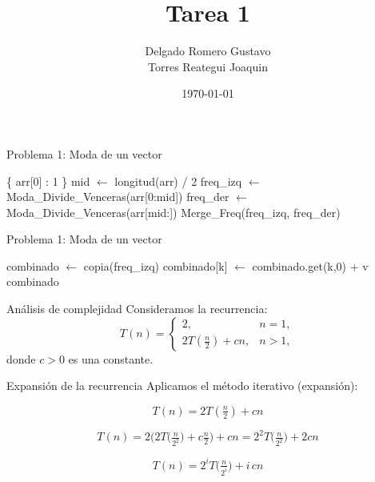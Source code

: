 \documentclass{beamer}
\title{Tarea 1}
\author{Delgado Romero Gustavo \\ Torres Reategui Joaquin}
\date{\today}
\begin{document}
\begin{frame}
  \titlepage
\end{frame}

\begin{frame}{Problema 1: Moda de un vector}
  \begin{algorithm}[H]
    \caption{Cálculo de la moda con Divide y Vencerás (Parte I)}
    \begin{algorithmic}[1]
          \State \Return \{ arr[0] : 1 \}
        \EndIf
        \State mid $\gets$ longitud(arr) / 2
        \State freq\_izq $\gets$ Moda\_Divide\_Venceras(arr[0:mid])
        \State freq\_der $\gets$ Moda\_Divide\_Venceras(arr[mid:])
        \State \Return Merge\_Freq(freq\_izq, freq\_der)
      \EndFunction
    \end{algorithmic}
  \end{algorithm}
\end{frame}

\begin{frame}{Problema 1: Moda de un vector}
  \begin{algorithm}[H]
    \caption{Cálculo de la moda con Divide y Vencerás (Parte II)}
    \begin{algorithmic}[1]
        \State combinado $\gets$ copia(freq\_izq)
          \State combinado[k] $\gets$ combinado.get(k,0) + v
        \EndFor
        \State \Return combinado
      \EndFunction
      
    \end{algorithmic}
  \end{algorithm}
\end{frame}

\begin{frame}{Análisis de complejidad}
Consideramos la recurrencia:
\[
T(n)=
\begin{cases}
2, & n=1, \\[6pt]
2T\!\left(\tfrac{n}{2}\right) + c n, & n>1,
\end{cases}
\]
donde \(c>0\) es una constante.

\bigskip

\end{frame}

\begin{frame}{Expansión de la recurrencia}
Aplicamos el método iterativo (expansión):

\[
T(n) = 2T\!\left(\tfrac{n}{2}\right) + cn
\]

\[
T(n) = 2\Big(2T\!\big(\tfrac{n}{2^2}\big) + c\tfrac{n}{2}\Big) + cn
      = 2^2T\!\big(\tfrac{n}{2^2}\big) + 2cn
\]

\[
T(n) = 2^iT\!\big(\tfrac{n}{2^i}\big) + i \, cn
\]
\end{frame}
\end{document}
